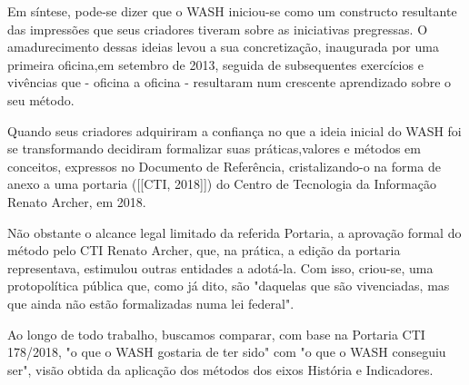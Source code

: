 Em síntese, pode-se dizer que o WASH iniciou-se como um constructo resultante das impressões que seus criadores tiveram sobre as iniciativas pregressas. O amadurecimento dessas ideias levou a sua concretização, inaugurada por uma primeira oficina,em setembro de 2013, seguida de subsequentes exercícios e  vivências que - oficina a oficina - resultaram num crescente aprendizado sobre o seu método.

Quando seus criadores adquiriram a confiança no que a ideia inicial do WASH foi se transformando decidiram formalizar suas práticas,valores e métodos em conceitos, expressos  no Documento de Referência, cristalizando-o na forma de anexo a uma portaria  ([[CTI, 2018]])  do Centro de Tecnologia da Informação Renato Archer, em 2018.

Não obstante o alcance legal limitado da referida Portaria, a aprovação formal do método pelo CTI Renato Archer, que, na prática, a edição da portaria representava, estimulou outras entidades a adotá-la. Com isso, criou-se, uma protopolítica pública que, como já dito, são "daquelas que são vivenciadas, mas que ainda não estão formalizadas numa lei federal".

Ao longo de todo trabalho, buscamos comparar, com base na Portaria CTI 178/2018, "o que o WASH gostaria de ter sido" com "o que o WASH conseguiu ser", visão obtida da aplicação dos métodos dos eixos História e Indicadores.


